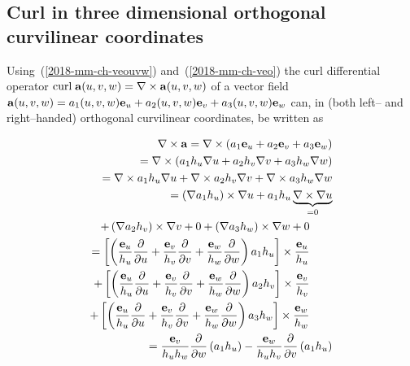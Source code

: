 \subsection{Curl in three dimensional orthogonal curvilinear coordinates}

Using~(\ref{2018-mm-ch-veouvw}) and~(\ref{2018-mm-ch-veo})
the curl differential operator
$\text{curl} \; {\bf a}(u,v,w) = \nabla \times {\bf a}(u,v,w)$  of a vector field
${\bf a}(u,v,w) =
a_1(u,v,w) {\bf e}_u +
a_2(u,v,w) {\bf e}_v +
a_3(u,v,w) {\bf e}_w$ can,
in  (both left-- and right--handed)
orthogonal curvilinear coordinates,
be written as

\begin{equation}
\begin{split}
\nabla \times {\bf a}
=
\nabla \times \left(
a_1  {\bf e}_u +
a_2  {\bf e}_v +
a_3  {\bf e}_w
\right)
\\ =
\nabla \times \left(
a_1   h_u  \nabla  u +
a_2   h_v  \nabla  v +
a_3   h_w  \nabla  w
\right)
\\ =
\nabla \times a_1   h_u  \nabla  u +
\nabla \times a_2   h_v  \nabla  v +
\nabla \times a_3   h_w  \nabla  w
\\ =
\left(\nabla a_1 h_u \right) \times \nabla  u  +
a_1 h_u    \underbrace{\nabla \times  \nabla  u  }_{=0}
\\
+\left(\nabla a_2 h_v \right) \times \nabla  v  +  0
+\left(\nabla a_3 h_w \right) \times \nabla  w  +  0
\qquad
\\ =
\left[\left(
\frac{{\bf e}_u}{h_u}  \frac{\partial   }{\partial u}    +
\frac{{\bf e}_v}{h_v}  \frac{\partial   }{\partial v}      +
\frac{{\bf e}_w}{h_w} \frac{\partial   }{\partial w}
\right) a_1 h_u \right] \times \frac{{\bf e}_u}{h_u}  \qquad \\
+ \left[\left(
\frac{{\bf e}_u}{h_u}  \frac{\partial   }{\partial u}    +
\frac{{\bf e}_v}{h_v}  \frac{\partial   }{\partial v}      +
\frac{{\bf e}_w}{h_w} \frac{\partial   }{\partial w}
\right) a_2 h_v \right] \times \frac{{\bf e}_v}{h_v}   \qquad \\
+\left[\left(
\frac{{\bf e}_u}{h_u}  \frac{\partial   }{\partial u}    +
\frac{{\bf e}_v}{h_v}  \frac{\partial   }{\partial v}      +
\frac{{\bf e}_w}{h_w} \frac{\partial   }{\partial w}
\right) a_3 h_w \right] \times \frac{{\bf e}_w}{h_w}   \qquad
\\ =
\frac{{\bf e}_v}{h_uh_w} \frac{\partial   }{\partial w}
\left( a_1 h_u \right)
-
\frac{{\bf e}_w}{h_uh_v} \frac{\partial   }{\partial v}
\left( a_1 h_u \right)
\\

\end{split}
\end{equation}
